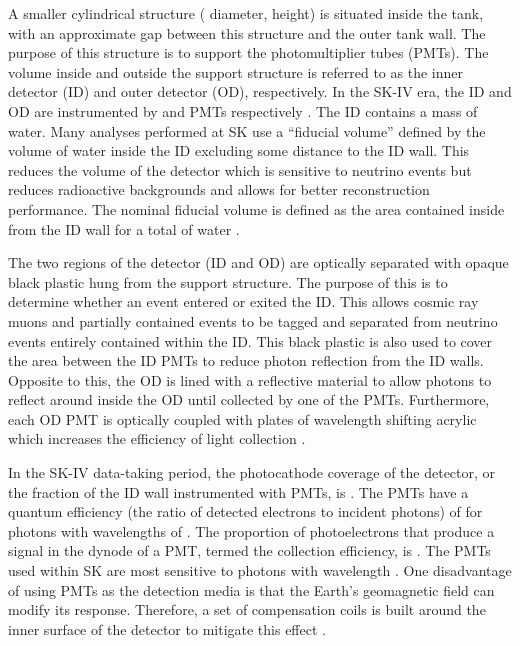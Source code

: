 A smaller cylindrical structure ( diameter,  height) is situated inside the tank, with an approximate  gap between this structure and the outer tank wall. The purpose of this structure is to support the photomultiplier tubes (PMTs). The volume inside and outside the support structure is referred to as the inner detector (ID) and outer detector (OD), respectively. In the SK-IV era, the ID and OD are instrumented by   and   PMTs respectively \cite{Abe_2014_SKCalib}. The ID contains a  mass of water. Many analyses performed at SK use a ``fiducial volume'' defined by the volume of water inside the ID excluding some distance to the ID wall. This reduces the volume of the detector which is sensitive to neutrino events but reduces radioactive backgrounds and allows for better reconstruction performance. The nominal fiducial volume is defined as the area contained inside  from the ID wall for a total of  water \cite{Jiang2019-iw}.

The two regions of the detector (ID and OD) are optically separated with opaque black plastic hung from the support structure. The purpose of this is to determine whether an event entered or exited the ID. This allows cosmic ray muons and partially contained events to be tagged and separated from neutrino events entirely contained within the ID. This black plastic is also used to cover the area between the ID PMTs to reduce photon reflection from the ID walls. Opposite to this, the OD is lined with a reflective material to allow photons to reflect around inside the OD until collected by one of the PMTs. Furthermore, each OD PMT is optically coupled with  plates of wavelength shifting acrylic which increases the efficiency of light collection \cite{Fukuda2003-ly}.

In the SK-IV data-taking period, the photocathode coverage of the detector, or the fraction of the ID wall instrumented with PMTs, is  \cite{Fukuda2003-ly}. The PMTs have a quantum efficiency (the ratio of detected electrons to incident photons) of  for photons with wavelengths of  \cite{KUME1983443, Suzuki1993}. The proportion of photoelectrons that produce a signal in the dynode of a PMT, termed the collection efficiency, is  \cite{Fukuda2003-ly}. The PMTs used within SK are most sensitive to photons with wavelength  \cite{Fukuda2003-ly}. One disadvantage of using PMTs as the detection media is that the Earth's geomagnetic field can modify its response. Therefore, a set of compensation coils is built around the inner surface of the detector to mitigate this effect \cite{t2k_sk}.

